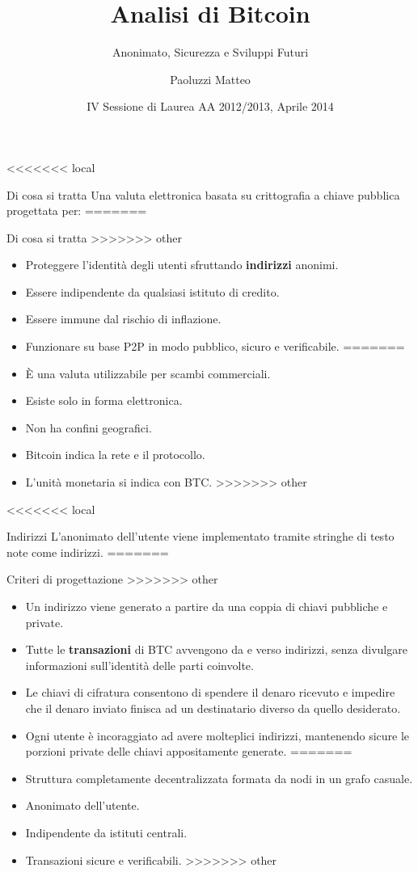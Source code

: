 \documentclass[italian]{beamer}
\title[Bitcoin]{Analisi di Bitcoin}
\subtitle{Anonimato, Sicurezza e Sviluppi Futuri}
\author[Paoluzzi Matteo]{Paoluzzi Matteo}
\institute[UniUD]{Università degli Studi di Udine\and{}Relatore:\\{}Dott. Ivan Scagnetto}
\institute[UniUD]{Università degli Studi di Udine\and{}Relatore:\\{}Prof. Ivan Scagnetto}
\date[2014/04/03]{IV Sessione di Laurea AA 2012/2013, Aprile 2014}
\begin{document}
\frame{\titlepage}

<<<<<<< local
\begin{frame}{Di cosa si tratta} %
Una valuta elettronica basata su crittografia a chiave pubblica progettata per:
=======
\begin{frame}{Di cosa si tratta}
>>>>>>> other
\begin{itemize}
<<<<<<< local
 \item Proteggere l'identità degli utenti sfruttando \textbf{indirizzi} anonimi.
 \item Essere indipendente da qualsiasi istituto di credito.
 \item Essere immune dal rischio di inflazione.
 \item Funzionare su base P2P in modo pubblico, sicuro e verificabile.
=======
 \item È una valuta utilizzabile per scambi commerciali.
 \item Esiste solo in forma elettronica.
 \item Non ha confini geografici.
 \item Bitcoin indica la rete e il protocollo.
 \item L'unità monetaria si indica con BTC.
>>>>>>> other
\end{itemize}
\end{frame}

<<<<<<< local
\begin{frame}{Indirizzi} %
L'anonimato dell'utente viene implementato tramite stringhe di testo note come indirizzi.
=======
\begin{frame}{Criteri di progettazione}
>>>>>>> other
\begin{itemize}
<<<<<<< local
 \item Un indirizzo viene generato a partire da una coppia di chiavi pubbliche e private.
 \item Tutte le \textbf{transazioni} di BTC avvengono da e verso indirizzi, senza divulgare informazioni sull'identità delle parti coinvolte.
 \item Le chiavi di cifratura consentono di spendere il denaro ricevuto e impedire che il denaro inviato finisca ad un destinatario diverso da quello desiderato.
 \item Ogni utente è incoraggiato ad avere molteplici indirizzi, mantenendo sicure le porzioni private delle chiavi appositamente generate.
=======
 \item Struttura completamente decentralizzata formata da nodi in un grafo casuale.
 \item Anonimato dell'utente.
 \item Indipendente da istituti centrali.
 \item Transazioni sicure e verificabili.
>>>>>>> other
\end{itemize}
\end{frame}


\end{frame}
\end{frame}
\end{document}
